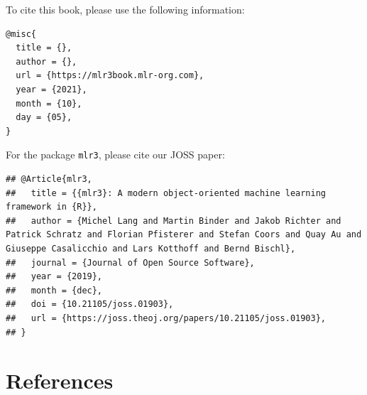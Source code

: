 \documentclass[
]{scrbook}
\begin{document}
To cite this book, please use the following information:

\begin{verbatim}
@misc{
  title = {},
  author = {},
  url = {https://mlr3book.mlr-org.com},
  year = {2021},
  month = {10},
  day = {05},
}
\end{verbatim}

For the package \texttt{mlr3}, please cite our JOSS paper:

\begin{verbatim}
## @Article{mlr3,
##   title = {{mlr3}: A modern object-oriented machine learning framework in {R}},
##   author = {Michel Lang and Martin Binder and Jakob Richter and Patrick Schratz and Florian Pfisterer and Stefan Coors and Quay Au and Giuseppe Casalicchio and Lars Kotthoff and Bernd Bischl},
##   journal = {Journal of Open Source Software},
##   year = {2019},
##   month = {dec},
##   doi = {10.21105/joss.01903},
##   url = {https://joss.theoj.org/papers/10.21105/joss.01903},
## }
\end{verbatim}

\hypertarget{references}{%
\chapter*{References}\label{references}}
\end{document}
